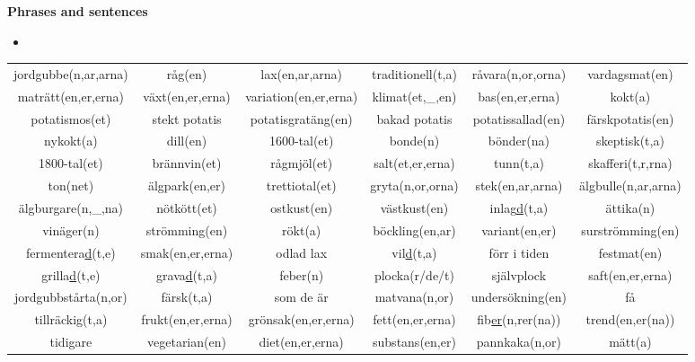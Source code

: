 
\begin{flushleft}
    \textbf{Phrases and sentences}
    \begin{itemize}
        \item 
    \end{itemize}
\end{flushleft}

\begin{center}
    \begin{adjustwidth}{-2.5cm}{}
        \begin{tabular}{|c c c c c c|}
            \hline
            jordgubbe(n,ar,arna) & råg(en) & lax(en,ar,arna) & traditionell(t,a) & råvara(n,or,orna) & vardagsmat(en) \\
            maträtt(en,er,erna) & växt(en,er,erna) & variation(en,er,erna) & klimat(et,\_,en) & bas(en,er,erna) & kokt(a) \\
            potatismos(et) & stekt potatis & potatisgratäng(en) & bakad potatis & potatissallad(en) & färskpotatis(en) \\
            nykokt(a) & dill(en) & 1600-tal(et) & bonde(n) & bönder(na) & skeptisk(t,a) \\
            1800-tal(et) & brännvin(et) & rågmjöl(et) & salt(et,er,erna) & tunn(t,a) & skafferi(t,r,rna) \\
            ton(net) & älgpark(en,er) & trettiotal(et) & gryta(n,or,orna) & stek(en,ar,arna) & älgbulle(n,ar,arna) \\
            älgburgare(n,\_,na) & nötkött(et) & ostkust(en) & västkust(en) & inlag\underline{d}(t,a) & ättika(n) \\
            vinäger(n) & strömming(en) & rökt(a) & böckling(en,ar) & variant(en,er) & surströmming(en) \\
            fermentera\underline{d}(t,e) & smak(en,er,erna) & odlad lax & vil\underline{d}(t,a) & förr i tiden & festmat(en) \\
            grilla\underline{d}(t,e) & grava\underline{d}(t,a) & feber(n) & plocka(r/de/t) & självplock & saft(en,er,erna) \\
            jordgubbstårta(n,or) & färsk(t,a) & som de är & matvana(n,or) & undersökning(en) & få \\
            tillräckig(t,a) & frukt(en,er,erna) & grönsak(en,er,erna) & fett(en,er,erna) & fib\underline{er}(n,rer(na)) & trend(en,er(na)) \\
            tidigare & vegetarian(en) & diet(en,er,erna) & substans(en,er) & pannkaka(n,or) & mätt(a) \\

\end{tabular}
\end{adjustwidth}
\end{center}
